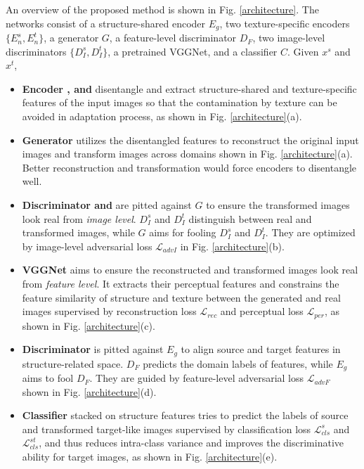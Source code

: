 \documentclass[10pt,journal,compsoc,twocolumn ]{IEEEtran}
\begin{document}
An overview of the proposed method is shown in Fig. \ref{architecture}. The networks consist of a structure-shared encoder $E_g$, two texture-specific encoders $\{E_n^s, E_n^t\}$, a generator $G$, a feature-level discriminator $D_F$, two image-level discriminators $\{D_I^s, D_I^t\}$, a pretrained VGGNet, and a classifier $C$. Given $x^s$ and $x^t$,
\begin{itemize}
  \item \textbf{Encoder ,  and } disentangle and extract structure-shared and texture-specific features of the input images so that the contamination by texture can be avoided in adaptation process, as shown in Fig. \ref{architecture}(a).
  \item \textbf{Generator}  utilizes the disentangled features to reconstruct the original input images and transform images across domains shown in Fig. \ref{architecture}(a). Better reconstruction and transformation would force encoders to disentangle well.
  \item \textbf{Discriminator  and } are pitted against $G$ to ensure the transformed images look real from \emph{image level}. $D_I^s$ and $D_I^t$ distinguish between real and transformed images, while $G$ aims for fooling $D_I^s$ and $D_I^t$. They are optimized by image-level adversarial loss $\mathcal{L}_{advI}$ in Fig. \ref{architecture}(b).
  \item \textbf{VGGNet} aims to ensure the reconstructed and transformed images look real from \emph{feature level}. It extracts their perceptual features and constrains the feature similarity of structure and texture between the generated and real images supervised by reconstruction loss $\mathcal{L}_{rec}$ and perceptual loss $\mathcal{L}_{per}$, as shown in Fig. \ref{architecture}(c). %
  \item \textbf{Discriminator}  is pitted against $E_g$ to align source and target features in structure-related space. %
  $D_F$ predicts the domain labels of features, while $E_g$ aims to fool $D_F$. They are guided by feature-level adversarial loss $\mathcal{L}_{advF}$ shown in Fig. \ref{architecture}(d).
  \item \textbf{Classifier}  stacked on structure features tries to predict the labels of source and transformed target-like images supervised by classification loss $\mathcal{L}_{cls}^{s}$ and $\mathcal{L}_{cls}^{st}$, and thus reduces intra-class variance and improves the discriminative ability for target images, as shown in Fig. \ref{architecture}(e).
\end{itemize}
\end{document}
